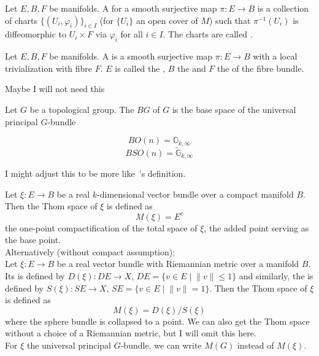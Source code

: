 \documentclass[a4paper,11pt]{article}
\begin{document}
\begin{definition}
    Let \(E,B,F\) be manifolds. A  for a smooth surjective map \(\pi:E\to B\) is a collection of charts \(\{(U_i,\varphi_i)\}_{i\in I}\) (for \(\{U_i\}\) an open cover of \(M\)) such that \(\pi^{-1}(U_i)\) is diffeomorphic to \(U_i\times F\) via \(\varphi_i\) for all \(i\in I\). The charts are called .
\end{definition}

\begin{definition}
    Let \(E,B,F\) be manifolds. A  is a smooth surjective map \(\pi:E\to B\) with a local trivialization with fibre \(F\).
    \(E\) is called the , \(B\) the  and \(F\) the  of the fibre bundle.
\end{definition}

Maybe I will not need this
\begin{definition}
    Let \(G\) be a topological group. The  \(BG\) of \(G\) is the base space of the universal principal \(G\)-bundle
\end{definition}

\begin{observation}
    \[BO(n)=\mathbb{G}_{k,\infty}\]
    \[BSO(n)=\widetilde{\mathbb{G}}_{k,\infty}\]
\end{observation}

I might adjust this to be more like\ \cite{thom}'s definition.
\begin{definition}
    Let \(\xi:E\to B\) be a real \(k\)-dimensional vector bundle over a compact manifold \(B\).
    Then the Thom space of \(\xi\) is defined as\[M(\xi)=E^c\] the one-point compactification of the total space of \(\xi\), the added point serving as the base point.\\
    Alternatively (without compact assumption):\\
    Let \(\xi:E\to B\) be a real vector bundle with Riemannian metric over a manifold \(B\). Its  is defined by \(D(\xi):DE\to X\), \(DE=\{v\in E\mid \lVert v\rVert \leq 1\}\) and similarly, the  is defined by \(S(\xi):SE\to X\), \(SE=\{v\in E\mid \lVert v\rVert = 1\}\). Then the Thom space of \(\xi\) is defined as
    \[M(\xi)=D(\xi)\big/S(\xi)\]
    where the sphere bundle is collapsed to a point. We can also get the Thom space without a choice of a Riemannian metric, but I will omit this here.\\
    For \(\xi\) the universal principal \(G\)-bundle, we can write \(M(G)\) instead of \(M(\xi)\).
\end{definition}
\end{document}
